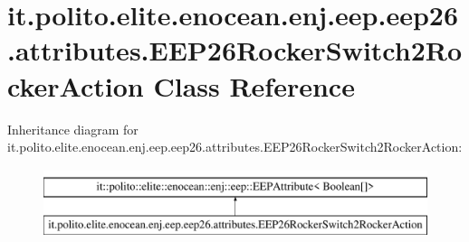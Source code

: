 \hypertarget{classit_1_1polito_1_1elite_1_1enocean_1_1enj_1_1eep_1_1eep26_1_1attributes_1_1_e_e_p26_rocker_switch2_rocker_action}{}\section{it.\+polito.\+elite.\+enocean.\+enj.\+eep.\+eep26.\+attributes.\+E\+E\+P26\+Rocker\+Switch2\+Rocker\+Action Class Reference}
\label{classit_1_1polito_1_1elite_1_1enocean_1_1enj_1_1eep_1_1eep26_1_1attributes_1_1_e_e_p26_rocker_switch2_rocker_action}
Inheritance diagram for it.\+polito.\+elite.\+enocean.\+enj.\+eep.\+eep26.\+attributes.\+E\+E\+P26\+Rocker\+Switch2\+Rocker\+Action\+:\begin{figure}[H]
\begin{center}
\leavevmode
\includegraphics[height=2.000000cm]{classit_1_1polito_1_1elite_1_1enocean_1_1enj_1_1eep_1_1eep26_1_1attributes_1_1_e_e_p26_rocker_switch2_rocker_action}
\end{center}
\end{figure}
